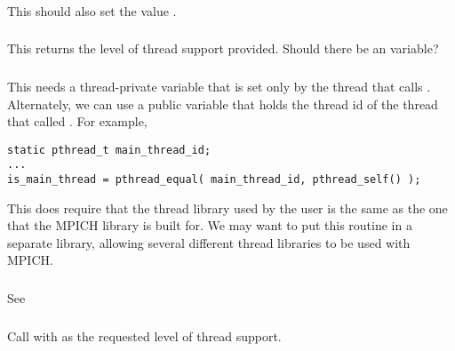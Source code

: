 \documentclass{article}
\begin{document}
\subsubsection{}
\begin{adi3}
\end{adi3}

\subsubsection{}
\begin{adi3}
\end{adi3}
This should also set the value .

\subsubsection{}
This returns the level of thread support provided.  Should there be an
 variable?

\subsubsection{}
This needs a thread-private variable that is set only by the thread that calls
.  Alternately, we can use a public variable that
holds the thread id of the thread that called .  For
example, 
\begin{verbatim}
static pthread_t main_thread_id;
...
is_main_thread = pthread_equal( main_thread_id, pthread_self() );
\end{verbatim}
This does require that the thread library used by the user is the same as the
one that the MPICH library is built for.  We may want to put this routine in a
separate library, allowing several different thread libraries to be used with
MPICH. 

\subsubsection{}
See 

\subsubsection{}
Call  with  as the
requested level of thread support.
\end{document}
